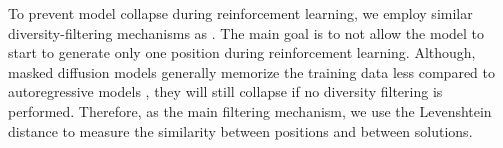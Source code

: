 To prevent model collapse during reinforcement learning, we employ similar diversity-filtering mechanisms as \citeauthor{feng2025generatingcreativechesspuzzles} \cite{feng2025generatingcreativechesspuzzles}. The main goal is to not allow the model to start to generate only one position during reinforcement learning. Although, masked diffusion models generally memorize the training data less compared to autoregressive models \cite{luo2026characterizingmemorizationdiffusionlanguage}, they will still collapse if no diversity filtering is performed. Therefore, as the main filtering mechanism, we use the Levenshtein distance to measure the similarity between positions and between solutions.



